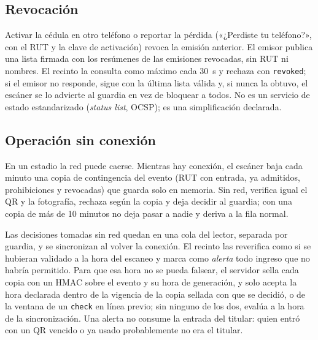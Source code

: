 \subsection{Revocación}
\label{sec:prototipo-revocacion}

Activar la cédula en otro teléfono o reportar la pérdida («¿Perdiste tu teléfono?», con el RUT y
la clave de activación) revoca la emisión anterior. El emisor publica una lista firmada con los
resúmenes de las emisiones revocadas, sin RUT ni nombres. El recinto la consulta como máximo cada
30~s y rechaza con \texttt{revoked}; si el emisor no responde, sigue con la última lista válida y,
si nunca la obtuvo, el escáner se lo advierte al guardia en vez de bloquear a todos. No es un
servicio de estado estandarizado (\emph{status list}, OCSP); es una simplificación declarada.

\subsection{Operación sin conexión}
\label{sec:prototipo-contingencia}

En un estadio la red puede caerse. Mientras hay conexión, el escáner baja cada minuto una copia de
contingencia del evento (RUT con entrada, ya admitidos, prohibiciones y revocadas) que guarda solo
en memoria. Sin red, verifica igual el QR y la fotografía, rechaza según la copia y deja decidir
al guardia; con una copia de más de 10 minutos no deja pasar a nadie y deriva a la fila normal.

Las decisiones tomadas sin red quedan en una cola del lector, separada por guardia, y se
sincronizan al volver la conexión. El recinto las reverifica como si se hubieran validado a la hora
del escaneo y marca como \emph{alerta} todo ingreso que no habría permitido. Para que esa hora no
se pueda falsear, el servidor sella cada copia con un HMAC sobre el evento y su hora de
generación, y solo acepta la hora declarada dentro de la vigencia de la copia sellada con que se
decidió, o de la ventana de un \texttt{check} en línea previo; sin ninguno de los dos, evalúa a la
hora de la sincronización. %
Una alerta no consume la entrada del titular: quien entró con un QR vencido o ya usado
probablemente no era el titular.

